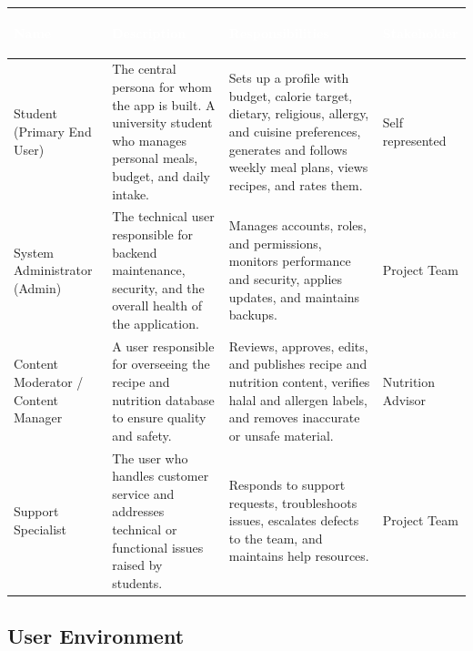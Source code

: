 \documentclass[11pt,a4paper]{article}
\begin{document}
\begin{tabularx}{\textwidth}{>{\bfseries\raggedright\arraybackslash}p{} Y Y >{\raggedright\arraybackslash}p{0.16\textwidth}}
\toprule
{}\textcolor{white}{\textbf{Name}} & \textcolor{white}{\textbf{Description}} & \textcolor{white}{\textbf{Responsibilities}} & \textcolor{white}{\textbf{Stakeholder}} \\
\midrule
Student (Primary End User) & The central persona for whom the app is built. A university student who manages personal meals, budget, and daily intake. & Sets up a profile with budget, calorie target, dietary, religious, allergy, and cuisine preferences, generates and follows weekly meal plans, views recipes, and rates them. & Self represented \\
System Administrator (Admin) & The technical user responsible for backend maintenance, security, and the overall health of the application. & Manages accounts, roles, and permissions, monitors performance and security, applies updates, and maintains backups. & Project Team \\
Content Moderator / Content Manager & A user responsible for overseeing the recipe and nutrition database to ensure quality and safety. & Reviews, approves, edits, and publishes recipe and nutrition content, verifies halal and allergen labels, and removes inaccurate or unsafe material. & Nutrition Advisor \\
Support Specialist & The user who handles customer service and addresses technical or functional issues raised by students. & Responds to support requests, troubleshoots issues, escalates defects to the team, and maintains help resources. & Project Team \\
\bottomrule
\end{tabularx}

\subsection{User Environment}
\end{document}
